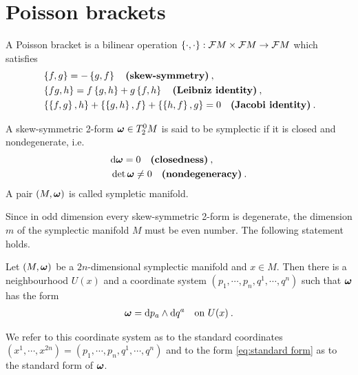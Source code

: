 \section{Poisson brackets}
    
\begin{definition}
    A Poisson bracket is a bilinear operation $\left \lbrace \cdot, \cdot \right \rbrace : \mathcal{F} M \times \mathcal{F} M \to \mathcal{F} M$ which satisfies
    \begin{align}
        &\left \lbrace f,g \right \rbrace = -\left \lbrace g,f \right \rbrace \quad \textbf{(skew-symmetry)} \:, \\
        &\left \lbrace fg,h \right \rbrace = f \left \lbrace g,h \right \rbrace + g \left \lbrace f,h \right \rbrace \quad \textbf{(Leibniz identity)} \:, \\
        &\left \lbrace \left \lbrace f,g \right \rbrace,h \right \rbrace + \left \lbrace \left \lbrace g,h \right \rbrace,f \right \rbrace + \left \lbrace \left \lbrace h,f \right \rbrace,g \right \rbrace = 0 \quad \textbf{(Jacobi identity)} \:.
    \end{align}
\end{definition}

\begin{definition}
    A skew-symmetric 2-form $\boldsymbol{\omega} \in T^0_2 M$ is said to be symplectic if it is closed and nondegenerate, i.e.
    \begin{align}
        &\mathrm{d} \boldsymbol{\omega} = 0 \quad \textbf{(closedness)} \:, \\
        &\det \boldsymbol{\omega} \neq 0 \quad \textbf{(nondegeneracy)}\:.
    \end{align}
    A pair $(M,\boldsymbol{\omega})$ is called sympletic manifold.
\end{definition}

Since in odd dimension every skew-symmetric 2-form is degenerate, the dimension $m$ of the symplectic manifold $M$ must be even number. The following statement holds.

\begin{theorem}
    Let $(M,\boldsymbol{\omega})$ be a $2n$-dimensional symplectic manifold and $x \in M$. Then there is a neighbourhood $U(x)$ and a coordinate system $(p_1,\cdots,p_n,q^1,\cdots,q^n)$ such that $\boldsymbol{\omega}$ has the form
    \begin{align}
        \boldsymbol{\omega} = \mathrm{d} p_a \wedge \mathrm{d} q^a \quad \text{on } U(x) \:. \label{eq:standart form}
    \end{align}
\end{theorem}
We refer to this coordinate system as to the standard coordinates \\$(x^1,\cdots, x^{2n}) = (p_1,\cdots,p_n,q^1,\cdots,q^n)$ and to the form \eqref{eq:standard form} as to the standard form of $\boldsymbol{\omega}$.

